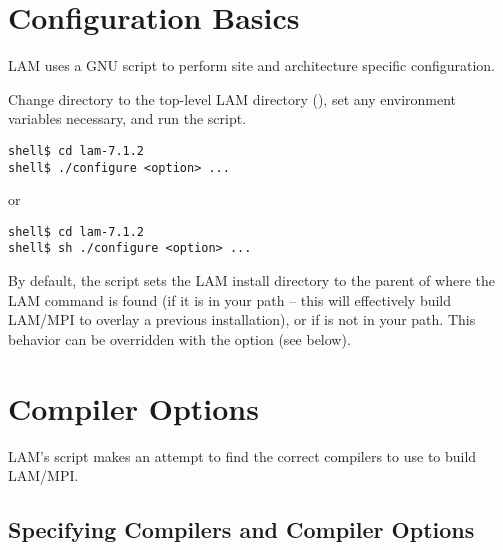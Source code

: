 
\section{Configuration Basics}

LAM uses a GNU  script to perform site and
architecture specific configuration.

Change directory to the top-level LAM directory
(), set any environment variables necessary, and
run the  script.

\lstset{style=lam-cmdline}
\begin{lstlisting}
shell$ cd lam-7.1.2
shell$ ./configure <option> ...
\end{lstlisting}

or 

\lstset{style=lam-cmdline}
\begin{lstlisting}
shell$ cd lam-7.1.2
shell$ sh ./configure <option> ...
\end{lstlisting}

By default, the  script sets the LAM install directory
to the parent of where the LAM command  is found (if it
is in your path -- this will effectively build LAM/MPI to overlay a
previous installation), or  if  is not
in your path.  This behavior can be overridden with the
 option (see below).




\section{Compiler Options}
\label{sec:configure:compiler}

LAM's  script makes an attempt to find the correct
compilers to use to build LAM/MPI.


\subsection{Specifying Compilers and Compiler Options}

